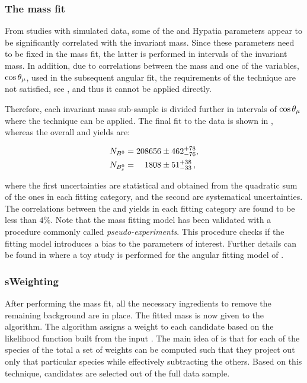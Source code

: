 \subsubsection{The mass fit}
From studies with simulated data, some of the \Bs and \Bd Hypatia parameters appear to be significantly correlated with the \mkpi
invariant mass. Since these parameters need to be fixed in the mass fit, the latter is performed in intervals of the
\mkpi invariant mass. In addition, due to correlations between the mass and one of the variables, $\cos\theta_{\mu}$, used in
the subsequent angular fit, the requirements of the \sPlot technique are not satisfied, see ,
and thus it cannot be applied directly.

Therefore, each \mkpi invariant mass sub-sample is divided further in intervals of $\cos\theta_{\mu}$ where the \sPlot technique
can be applied. The final fit to the data is shown in , whereas the overall \Bs and \Bd yields are:

\begin{align}
  \centering
  N_{\Bd} &= 208656  \pm  462 ^{+ 78}_{-76}, \\
  N_{\Bs} &= \phantom{00}1808  \pm  51 ^{+ 38}_{-33} \, ,
  \label{signal_yields}
\end{align}

\noindent where the first uncertainties are statistical and obtained from the quadratic sum of the ones in each fitting category,
and the second are systematical uncertainties. The correlations between the \Bd and \Bs yields in each fitting category
are found to be less than $4\%$. Note that the mass fitting model has been validated with a procedure commonly called {\it pseudo-experiments}.
This procedure checks if the fitting model introduces a bias to the parameters of interest. Further details can be found in
 where a toy study is performed for the angular fitting model of .

\subsubsection{sWeighting}
After performing the mass fit, all the necessary ingredients to remove the remaining background are in place.
The fitted mass \pdf is now given to the \sPlot algorithm. The algorithm assigns a weight to each candidate
based on the likelihood function built from the input \pdf. The main idea of \sPlot is that for each of the
species of the total \pdf a set of weights can be computed such that they project out only that particular
species while effectively subtracting the others. Based on this technique, \BsJpsiKst candidates are selected
out of the full data sample.

